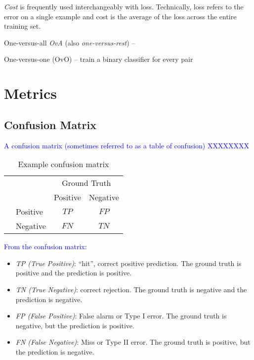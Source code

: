 \emph{Cost} is frequently used interchangeably with loss. Technically, loss refers to the error on a single example and cost is the average of the loss across the entire training set.

One-versus-all \emph{OvA} (also \emph{one-versus-rest}) -- 

One-versus-one (OvO) -- train a binary classifier for every pair


\section{Metrics}


\subsection{Confusion Matrix}
\textcolor{blue}{A confusion matrix (sometimes referred to as a table of confusion) XXXXXXXX}

\begin{table}
	\centering
	\begin{tabular}{l|l|c|c|}
		\multicolumn{2}{c}{}&\multicolumn{2}{c}{Ground Truth}\\ 
		\cline{3-4}
		\multicolumn{2}{c|}{}&Positive&Negative\\ 
		\cline{2-4}
		\multirow{2}{*}{\rotatebox{90}{Pred}}& Positive & $TP$ & $FP$ \\ 
		\cline{2-4}
		& Negative & $FN$ & $TN$ \\ 
		\cline{2-4}
	\end{tabular}
	\caption{Example confusion matrix}
	\label{tab:sample_conf_matrix}
\end{table}

\textcolor{blue}{From the confusion matrix:}

\begin{itemize}
	
\item \textit{TP (True Positive)}: ``hit'', correct positive prediction. The ground truth is positive and the prediction is positive.

\item \textit{TN (True Negative)}: correct rejection. The ground truth is negative and the prediction is negative.

\item \textit{FP (False Positive)}: False alarm or Type I error. The ground truth is negative, but the prediction is positive.

\item \textit{FN (False Negative)}: Miss or Type II error. The ground truth is positive, but the prediction is negative.
	
\end{itemize}

